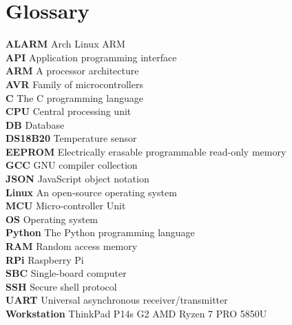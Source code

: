 \section*{Glossary}%
\label{sec:glossary}

\textbf{ALARM} Arch Linux ARM \\
\textbf{API} Application programming interface \\
\textbf{ARM} A processor architecture \\
\textbf{AVR} Family of microcontrollers \\
\textbf{C} The C programming language \\
\textbf{CPU} Central processing unit \\
\textbf{DB} Database \\
\textbf{DS18B20} Temperature sensor \\
\textbf{EEPROM} Electrically erasable programmable read-only memory \\
\textbf{GCC} GNU compiler collection \\
\textbf{JSON} JavaScript object notation \\
\textbf{Linux} An open-source operating system \\
\textbf{MCU} Micro-controller Unit \\
\textbf{OS} Operating system \\
\textbf{Python} The Python programming language \\
\textbf{RAM} Random access memory \\
\textbf{RPi} Raspberry Pi \\
\textbf{SBC} Single-board computer \\
\textbf{SSH} Secure shell protocol\\
\textbf{UART} Universal asynchronous receiver/transmitter \\
\textbf{Workstation} ThinkPad P14s G2 AMD Ryzen 7 PRO 5850U \\

